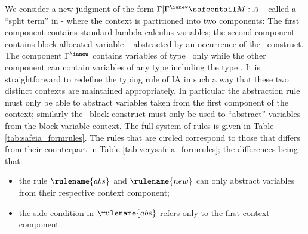 We consider a new judgment of the form $\Gamma | \Gamma^{\ianew}
\safeentail M : A$ - called a ``split term'' in \cite{abramsky:game-semantics-tutorial} - where the context is partitioned into two
components: The first component contains standard lambda calculus
variables; the second component contains block-allocated variable --
abstracted by an occurrence of the \ianew\ construct. The component
$\Gamma^{\ianew}$ contains variables of type \iavar\ only while the
other component can contain variables of any type including the type
\iavar. It is straightforward to redefine the typing rule of IA in
such a way that these two distinct contexts are maintained
appropriately. In particular the abstraction rule must only be able
to abstract variables taken from the first component of the context;
similarly the \ianew\ block construct must only be used to
``abstract'' variables from the block-variable context. The full
system of rules is given in Table \ref{tab:safeia_formrules}. The
rules that are circled correspond to those that differs from their
counterpart in Table \ref{tab:verysafeia_formrules}; the differences
being that:
\begin{itemize}
\item the rule $\rulename{abs}$ and $\rulename{new}$ can only
abstract variables from their respective context component;
\item the side-condition in $\rulename{abs}$ refers only to
the first context component.
\end{itemize}

